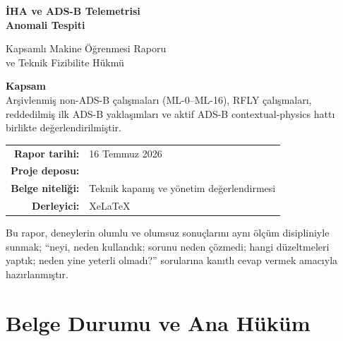 \documentclass[11pt,a4paper,oneside]{report}
\newcommand{\code}[1]{\texttt{\detokenize{#1}}}
\begin{document}
\begin{titlepage}
  \centering
  \vspace*{1.3cm}

  {\sffamily\bfseries\color{Navy}\fontsize{25}{31}\selectfont
  İHA ve ADS-B Telemetrisi\\[0.25em]
  Anomali Tespiti\par}

  \vspace{0.8cm}

  {\sffamily\color{Blue}\fontsize{16}{21}\selectfont
  Kapsamlı Makine Öğrenmesi Raporu\\
  ve Teknik Fizibilite Hükmü\par}

  \vspace{1.4cm}

  \begin{tcolorbox}[
    width=0.88\textwidth,
    colback=LightGray,
    colframe=RuleGray,
    boxrule=0.6pt,
    arc=2mm,
    left=5mm,right=5mm,top=4mm,bottom=4mm
  ]
  \centering
  \sffamily
  \textbf{Kapsam}\\[0.3em]
  Arşivlenmiş non-ADS-B çalışmaları (ML-0--ML-16), RFLY çalışmaları,
  reddedilmiş ilk ADS-B yaklaşımları ve aktif ADS-B contextual-physics hattı
  birlikte değerlendirilmiştir.
  \end{tcolorbox}

  \vfill

  \begin{tabular}{rl}
    \textbf{Rapor tarihi:} & 16 Temmuz 2026\\
    \textbf{Proje deposu:} & \code{AnomalyDetection}\\
    \textbf{Belge niteliği:} & Teknik kapanış ve yönetim değerlendirmesi\\
    \textbf{Derleyici:} & XeLaTeX\\
  \end{tabular}

  \vspace{1.2cm}

  {\small\color{MidGray}
  Bu rapor, deneylerin olumlu ve olumsuz sonuçlarını aynı ölçüm disipliniyle
  sunmak; ``neyi, neden kullandık; sorunu neden çözmedi; hangi düzeltmeleri
  yaptık; neden yine yeterli olmadı?'' sorularına kanıtlı cevap vermek amacıyla
  hazırlanmıştır.\par}
\end{titlepage}


\chapter*{Belge Durumu ve Ana Hüküm}
\end{document}
